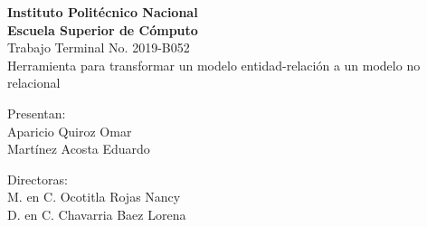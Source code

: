\begin{titlepage}
    \begin{center}
        \vspace*{1cm}
        
        \Large
        \textbf{Instituto Politécnico Nacional}\\
        \textbf{Escuela Superior de Cómputo}\\
        

        \vspace{0.5cm}
        \LARGE
        Trabajo Terminal No. 2019-B052\\
        \vspace{1cm}
        Herramienta para transformar un modelo entidad-relación a un modelo no relacional

        \vspace{1.5cm}
        \begin{center}
            
            Presentan: \\
            Aparicio Quiroz Omar\\
            Martínez Acosta Eduardo\\
            
            \vfill
            
            Directoras:\\
            M. en C. Ocotitla Rojas Nancy\\
            D. en C. Chavarria Baez Lorena
            
            \vspace{0.8cm}
            
        \end{center}

    \end{center}
\end{titlepage}
